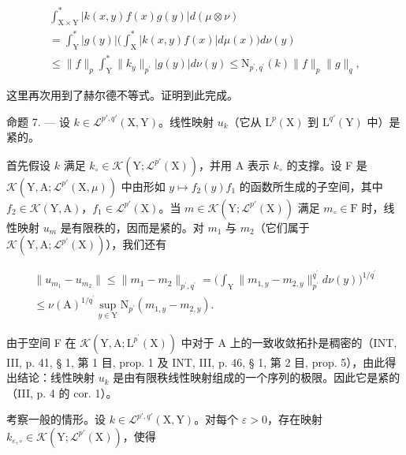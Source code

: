 \[
\begin{array}{l} \int_ {\mathrm{X} \times \mathrm{Y}} ^ {*} | k (x, y) f (x) g (y) | d (\mu \otimes \nu) \\ = \int_ {\mathrm{Y}} ^ {*} | g (y) | \Big (\int_ {\mathrm{X}} ^ {*} | k (x, y) f (x) | d \mu (x) \Big) d \nu (y) \\ \leqslant \| f \| _ {p} \int_ {\mathrm{Y}} ^ {*} \| k _ {y} \| _ {p ^ {\prime}} | g (y) | d \nu (y) \leqslant \mathrm{N} _ {p ^ {\prime}, q ^ {\prime}} (k) \| f \| _ {p} \| g \| _ {q}, \end{array}
\]

这里再次用到了赫尔德不等式。证明到此完成。

命题 7. --- 设 \(k \in \mathcal{L}^{p',q'}(\mathrm{X},\mathrm{Y})\)。线性映射 \(u_k\)（它从 \(\mathrm{L}^p (\mathrm{X})\) 到 \(\mathrm{L}^{q'}(\mathrm{Y})\) 中）是紧的。

首先假设 \(k\) 满足 \(k_{\circ} \in \mathcal{K}(\mathrm{Y}; \mathcal{L}^{p'}(\mathrm{X}))\)，并用 A 表示 \(k_{\circ}\) 的支撑。设 F 是 \(\mathcal{K}(\mathrm{Y}, \mathrm{A}; \mathcal{L}^{p'}(\mathrm{X}, \mu))\) 中由形如 \(y \mapsto f_2(y)f_1\) 的函数所生成的子空间，其中 \(f_2 \in \mathcal{K}(\mathrm{Y}, \mathrm{A})\)，\(f_1 \in \mathcal{L}^{p'}(\mathrm{X})\)。当 \(m \in \mathcal{K}(\mathrm{Y}; \mathcal{L}^{p'}(\mathrm{X}))\) 满足 \(m_{\circ} \in \mathrm{F}\) 时，线性映射 \(u_m\) 是有限秩的，因而是紧的。对 \(m_1\) 与 \(m_2\)（它们属于 \(\mathcal{K}(\mathrm{Y}, \mathrm{A}; \mathcal{L}^{p'}(\mathrm{X}))\)），我们还有

\[
\begin{array}{c} \| u _ {m _ {1}} - u _ {m _ {2}} \| \leqslant \| m _ {1} - m _ {2} \| _ {p ^ {\prime}, q ^ {\prime}} = \Big (\int_ {\mathrm{Y}} \| m _ {1, y} - m _ {2, y} \| _ {p ^ {\prime}} ^ {q ^ {\prime}} d \nu (y) \Big) ^ {1 / q ^ {\prime}} \\ \leqslant \nu (\mathrm{A}) ^ {1 / q ^ {\prime}} \sup _ {y \in \mathrm{Y}} \mathrm{N} _ {p ^ {\prime}} (m _ {1, y} - m _ {2, y}). \end{array}
\]

由于空间 F 在 \(\mathcal{K}(\mathrm{Y},\mathrm{A};\mathrm{L}^{p^{\prime}}(\mathrm{X}))\) 中对于 A 上的一致收敛拓扑是稠密的（INT, III, p. 41, § 1, 第 1 目, prop. 1 及 INT, III, p. 46, § 1, 第 2 目, prop. 5），由此得出结论：线性映射 \(u_{k}\) 是由有限秩线性映射组成的一个序列的极限。因此它是紧的（III, p. 4 的 cor. 1）。

考察一般的情形。设 \(k \in \mathcal{L}^{p', q'}(\mathrm{X}, \mathrm{Y})\)。对每个 \(\varepsilon > 0\)，存在映射 \(k_{\varepsilon, \circ} \in \mathcal{K}(\mathrm{Y}; \mathcal{L}^{p'}(\mathrm{X}))\)，使得

